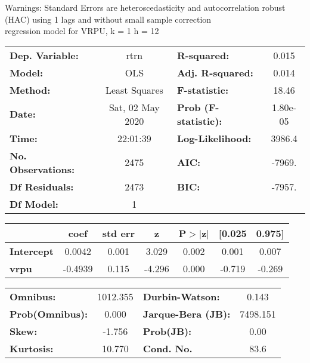 Warnings: \newline
 [1] Standard Errors are heteroscedasticity and autocorrelation robust (HAC) using 1 lags and without small sample correction\\ 

regression model for VRPU, k = 1 h = 12\begin{center}
\begin{tabular}{lclc}
\toprule
\textbf{Dep. Variable:}    &       rtrn       & \textbf{  R-squared:         } &     0.015   \\
\textbf{Model:}            &       OLS        & \textbf{  Adj. R-squared:    } &     0.014   \\
\textbf{Method:}           &  Least Squares   & \textbf{  F-statistic:       } &     18.46   \\
\textbf{Date:}             & Sat, 02 May 2020 & \textbf{  Prob (F-statistic):} &  1.80e-05   \\
\textbf{Time:}             &     22:01:39     & \textbf{  Log-Likelihood:    } &    3986.4   \\
\textbf{No. Observations:} &        2475      & \textbf{  AIC:               } &    -7969.   \\
\textbf{Df Residuals:}     &        2473      & \textbf{  BIC:               } &    -7957.   \\
\textbf{Df Model:}         &           1      & \textbf{                     } &             \\
\bottomrule
\end{tabular}
\begin{tabular}{lcccccc}
                   & \textbf{coef} & \textbf{std err} & \textbf{z} & \textbf{P$> |$z$|$} & \textbf{[0.025} & \textbf{0.975]}  \\
\midrule
\textbf{Intercept} &       0.0042  &        0.001     &     3.029  &         0.002        &        0.001    &        0.007     \\
\textbf{vrpu}      &      -0.4939  &        0.115     &    -4.296  &         0.000        &       -0.719    &       -0.269     \\
\bottomrule
\end{tabular}
\begin{tabular}{lclc}
\textbf{Omnibus:}       & 1012.355 & \textbf{  Durbin-Watson:     } &    0.143  \\
\textbf{Prob(Omnibus):} &   0.000  & \textbf{  Jarque-Bera (JB):  } & 7498.151  \\
\textbf{Skew:}          &  -1.756  & \textbf{  Prob(JB):          } &     0.00  \\
\textbf{Kurtosis:}      &  10.770  & \textbf{  Cond. No.          } &     83.6  \\
\bottomrule
\end{tabular}
\end{center}

